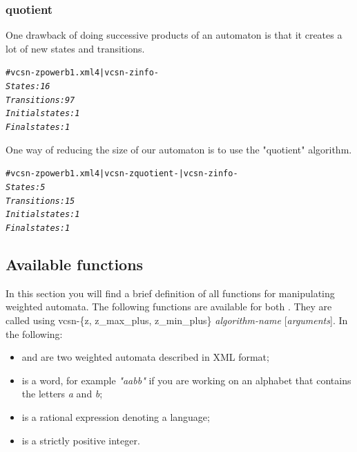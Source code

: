 \subsubsection{quotient}

One drawback of doing successive products of an automaton is
that it creates a lot of new states and transitions.
\begin{alltt}
# vcsn-z power b1.xml 4 | vcsn-z info -
\textit{States: 16}
\textit{Transitions: 97}
\textit{Initial states: 1}
\textit{Final states: 1}
\end{alltt}
One way of reducing the size of our automaton is to use the "quotient"
algorithm.
\begin{alltt}
# vcsn-z power b1.xml 4 | vcsn-z quotient - | vcsn-z info -
\textit{States: 5}
\textit{Transitions: 15}
\textit{Initial states: 1}
\textit{Final states: 1}
\end{alltt}

\subsection{Available functions}
In this section you will find a brief definition of all functions for
manipulating weighted automata. The following functions are available
for both . They are called using vcsn-\{z, z\_max\_plus, z\_min\_plus\}
\textit{algorithm-name} [\textit{arguments}]. In the following:

\begin{itemize}
\item {} and  are two weighted automata
  described in \Vauc XML format;
\item {} is a word, for example \textit{"aabb"} if you are
  working on an alphabet that contains the letters \textit{a} and
  \textit{b};
\item {} is a rational expression denoting a language;
\item {} is a strictly positive integer.
\end{itemize}
\newpage

